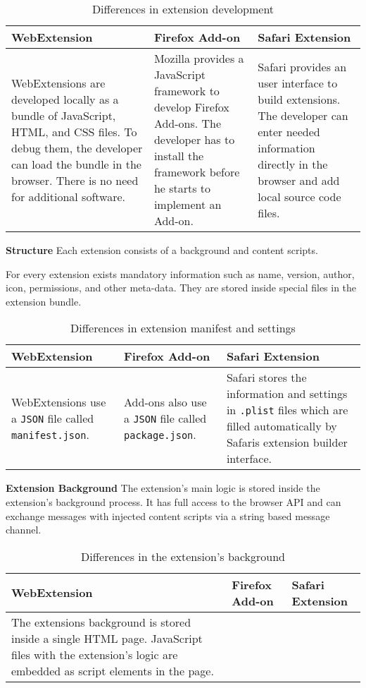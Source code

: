 	\begin{table}[h]
		\begin{tabular}{|p{}|p{}|p{}|}\hline
			\textbf{WebExtension} & \textbf{Firefox Add-on} & \textbf{Safari Extension} \\ \hline
			WebExtensions are developed locally as a bundle of JavaScript, HTML, and CSS files. To debug them, the developer can load the bundle in the browser. There is no need for additional software. & 
			Mozilla provides a JavaScript framework to develop Firefox Add-ons. The developer has to install the framework before he starts to implement an Add-on. & 
			Safari provides an user interface to build extensions. The developer can enter needed information directly in the browser and add local source code files. \\ \hline
		\end{tabular}
		\caption{Differences in extension development}	
	\end{table}

	\textbf{Structure} Each extension consists of a background and content scripts.
	
	
	For every extension exists mandatory information such as name, version, author, icon, permissions, and other meta-data. They are stored inside special files in the extension bundle. 
	
	\begin{table}[h]
		\begin{tabular}{|p{}|p{}|p{}|}\hline
				\textbf{WebExtension} & \textbf{Firefox Add-on} & \textbf{Safari Extension} \\ \hline
				WebExtensions use a \texttt{JSON} file called \texttt{manifest.json}. & 
				Add-ons also use a \texttt{JSON} file called \texttt{package.json}. & 
				Safari stores the information and settings in \texttt{.plist} files which are filled automatically by Safaris extension builder interface. \\ \hline
			\end{tabular}
		\caption{Differences in extension manifest and settings}
	\end{table}

	\textbf{Extension Background} The extension's main logic is stored inside the extension's background process. It has full access to the browser API and can exchange messages with injected content scripts via a string based message channel.
	
	\begin{table}[h]
		\begin{tabular}{|p{}|p{}|p{}|}\hline
			\textbf{WebExtension} & \textbf{Firefox Add-on} & \textbf{Safari Extension} \\ \hline
			The extensions background is stored inside a single HTML page. JavaScript files with the extension's logic are embedded as script elements in the page.  & 
			& 
			\\ \hline 
		\end{tabular}
		\caption{Differences in the extension's background}
	\end{table}
	
